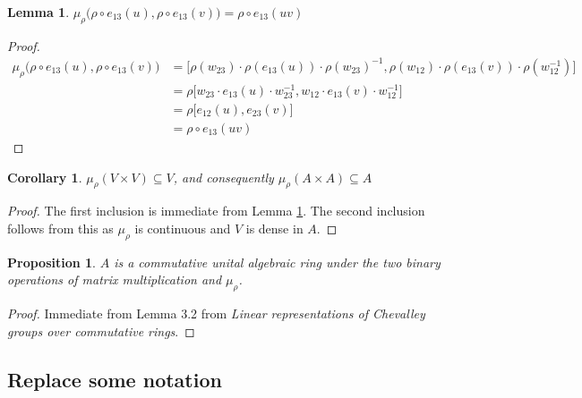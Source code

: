 \documentclass[12pt]{article}
\newtheorem{proposition}{Proposition}
\newtheorem{lemma}{Lemma}
\newtheorem{corollary}{Corollary}
\theoremstyle{definition}
\newcommand{\inv}{^{-1}}
\begin{document}
\begin{lemma}
\label{multiplicative}
$\mu_\rho \Big( \rho \circ e_{13}(u) , \rho \circ e_{13}(v) \Big) = \rho \circ  e_{13}(uv)$
\end{lemma}
\begin{proof}
\begin{align*}
	\mu_\rho \Big( \rho \circ e_{13}(u) , \rho \circ e_{13}(v) \Big)  &= \Big[ \rho(w_{23}) \cdot \rho (e_{13}(u)) \cdot \rho(w_{23}) \inv, \rho(w_{12}) \cdot \rho(e_{13}(v)) \cdot \rho(w_{12} \inv) \Big] \\
&= \rho \Big[ w_{23} \cdot e_{13}(u) \cdot w_{23} \inv, w_{12} \cdot e_{13}(v) \cdot w_{12} \inv \Big] \\
&= \rho \Big[ e_{12}(u), e_{23}(v) \Big] \\
&=  \rho \circ  e_{13}(uv)
\end{align*}
\end{proof}

\begin{corollary}
$\mu_\rho(V \times V) \subseteq V$, and consequently $\mu_\rho(A \times A) \subseteq A$
\end{corollary}
\begin{proof}
The first inclusion is immediate from Lemma \ref{multiplicative}. The second inclusion follows from this as $\mu_\rho$ is continuous and $V$ is dense in $A$.
\end{proof}

\begin{proposition}
$A$ is a commutative unital algebraic ring under the two binary operations of matrix multiplication and $\mu_\rho$.
\end{proposition}
\begin{proof}
Immediate from Lemma 3.2 from \textit{Linear representations of Chevalley groups over commutative rings}.
\end{proof}

\newpage

\subsection{Replace some notation}
\end{document}
